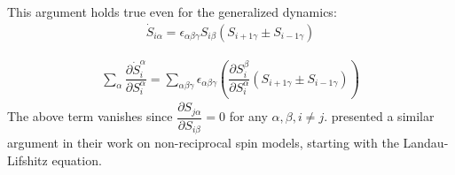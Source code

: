 \documentclass[prl,aps,twocolumn,nosuperscriptaddress,bibnotes,notitlepage,nofootinbib]{revtex4-2}
\newcommand{\abc}{\alpha \beta \gamma}
\begin{document}
This argument holds true even for the generalized dynamics:
\begin{align*}
\dot{S}_{i \alpha} = \epsilon_{\abc}S_{i \beta}(S_{i+1 \gamma} \pm S_{i-1 \gamma})    
\end{align*}

\begin{align}
    \sum_{\alpha} \dfrac{\partial \dot{S}_i^{\alpha}}{\partial S_i^{\alpha}} = \sum_{\abc} \epsilon_{\abc}\left(\dfrac{\partial S_i^{\beta}}{\partial S_i^{\alpha}} (S_{i+1 \gamma} \pm S_{i-1 \gamma}) \right)
\end{align}
The above term vanishes since $\dfrac{\partial S _{j \alpha}}{\partial S_{i \beta}} = 0 $ for any $ \alpha, \beta, i \neq j$. \cite{2208.08577} presented a similar argument in their work on non-reciprocal spin models, starting with the Landau-Lifshitz equation. 

%

\end{document}
